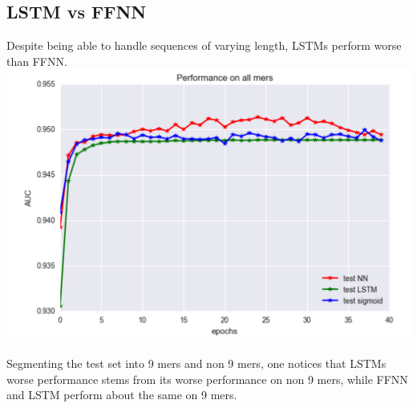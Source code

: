 \documentclass{article} %
\begin{document}
\subsection{LSTM vs FFNN}
Despite being able to handle sequences of varying length, LSTMs perform worse than FFNN. \\

\includegraphics[scale = 0.3]{LSTM_vs_FFN_vs_sigmoid.png}

Segmenting the test set into 9 mers and non 9 mers, one notices that LSTMs worse performance stems from its worse performance on non 9 mers, while FFNN and LSTM perform about the same on 9 mers.\\
\end{document}
